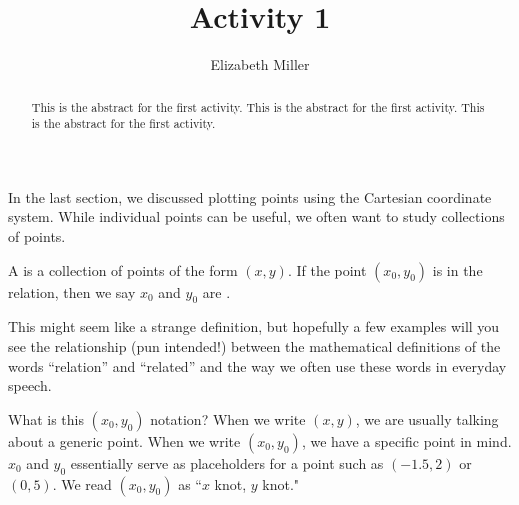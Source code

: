 \documentclass{ximera}
\author{Elizabeth Miller}
\title{Activity 1}
\begin{document}
\begin{abstract}
This is the abstract for the first activity. This is the abstract for the first activity. This is the abstract for the first activity. 
\end{abstract}
\maketitle



In the last section, we discussed plotting points using the Cartesian coordinate system. While individual points can be useful, we often want to study collections of points.


\begin{definition}
A  is a collection of points of the form $(x,y)$.  If the point $(x_0,y_0)$ is in the relation, then we say $x_0$ and $y_0$ are .
\end{definition}

This might seem like a strange definition, but hopefully a few
examples will you see the relationship (pun intended!) between the
mathematical definitions of the words ``relation'' and ``related'' and the
way we often use these words in everyday speech.

\begin{MM}
What is this $(x_0,y_0)$ notation?  When we write $(x,y)$, we are usually talking about a generic point.  When we write $(x_0,y_0)$, we have a specific point in mind.  $x_0$ and $y_0$ essentially serve as placeholders for a point such as $(-1.5, 2)$ or $(0,5)$. We read $(x_0,y_0)$ as ``$x$ knot, $y$ knot."
\end{MM}
\end{document}
